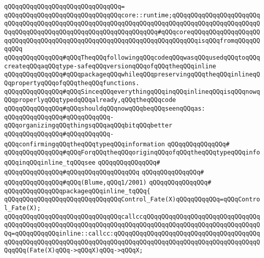 \verb|qQQqqQQqqQQqqQQqqQQqqQQqqQQqqQQq=|\newline
\verb|qQQqqQQqqQQqqQQqqQQqqQQqqQQqqQQqcore::runtime;qQQqqQQqqQQqqQQqqQQqqQQqqQQqqQQqqQQqqQQqqQQqqQQqqQQqqQQqqQQqqQQqqQQqqQQqqQQqqQQqqQQqqQQqqQQqqQQqqQQqqQQqqQQqqQQqqQQqqQQqqQQqqQQqqQQqqQQq#qQQqcoreqQQqqQQqqQQqqQQqqQQqqQQqqQQqqQQqqQQqqQQqqQQqqQQqqQQqqQQqqQQqqQQqqQQqqQQqisqQQqfromqQQqqQQqqQQq|\newline
\newline
\verb|qQQqqQQqqQQqqQQq#qQQqTheqQQqfollowingqQQqcodeqQQqwasqQQqusedqQQqtoqQQqcreateqQQqaqQQqtype-safeqQQqversionqQQqofqQQqtheqQQqinline|\newline
\verb|qQQqqQQqqQQqqQQq#qQQqpackageqQQqwhileqQQqpreservingqQQqtheqQQqinlineqQQqpropertyqQQqofqQQqtheqQQqfunctions.|\newline
\verb|qQQqqQQqqQQqqQQq#qQQqSinceqQQqeverythingqQQqinqQQqinlineqQQqisqQQqnowqQQqproperlyqQQqtypedqQQqalready,qQQqtheqQQqcode|\newline
\verb|qQQqqQQqqQQqqQQq#qQQqshouldqQQqnowqQQqbeqQQqseenqQQqas:|\newline
\verb|qQQqqQQqqQQqqQQq#qQQqqQQqqQQq-qQQqorganizingqQQqthingsqQQqaqQQqbitqQQqbetter|\newline
\verb|qQQqqQQqqQQqqQQq#qQQqqQQqqQQq-qQQqconfirmingqQQqtheqQQqtypeqQQqinformation|\newline
\verb|qQQqqQQqqQQqqQQq#|\newline
\verb|qQQqqQQqqQQqqQQq#qQQqForqQQqtheqQQqoriginqQQqofqQQqtheqQQqtypeqQQqinfoqQQqinqQQqinline_tqQQqsee|\newline
\verb|qQQqqQQqqQQqqQQq#|\newline
\verb|qQQqqQQqqQQqqQQq#qQQqqQQqqQQqqQQqqQQq|\newline
\verb|qQQqqQQqqQQqqQQq#|\newline
\verb|qQQqqQQqqQQqqQQq#qQQq(Blume,qQQq1/2001)|\newline
\verb|qQQqqQQqqQQqqQQq#|\newline
\verb|qQQqqQQqqQQqqQQqpackageqQQqinline_tqQQq{|\newline
\newline
\verb|qQQqqQQqqQQqqQQqqQQqqQQqqQQqqQQqControl_Fate(X)qQQqqQQqqQQq=qQQqControl_Fate(X);|\newline
\newline
\verb|qQQqqQQqqQQqqQQqqQQqqQQqqQQqqQQqcallccqQQqqQQqqQQqqQQqqQQqqQQqqQQqqQQqqQQqqQQqqQQqqQQqqQQqqQQqqQQqqQQqqQQqqQQqqQQqqQQqqQQqqQQqqQQqqQQqqQQqqQQq=qQQqqQQqqQQqinline::callcc:qQQqqQQqqQQqqQQqqQQqqQQqqQQqqQQqqQQqqQQqqQQqqQQqqQQqqQQqqQQqqQQqqQQqqQQqqQQqqQQqqQQqqQQqqQQqqQQqqQQqqQQqqQQqqQQqqQQq(Fate(X)qQQq->qQQqX)qQQq->qQQqX;|\newline
